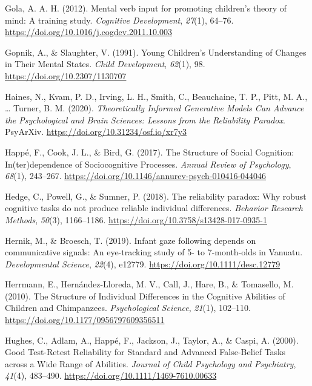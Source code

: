 \documentclass[
  man,floatsintext]{apa6}
\newlength{\cslhangindent}
\newlength{\cslentryspacingunit} %
\newenvironment{CSLReferences}[2] %
 {%
  \setlength{\parindent}{0pt}
  \ifodd #1
  \let\oldpar\par
  \def\par{\hangindent=\cslhangindent\oldpar}
  \fi
  \setlength{\parskip}{#2\cslentryspacingunit}
 }%
 {}
\begin{document}
\begin{CSLReferences}{1}{0}
\leavevmode{}%
Gola, A. A. H. (2012). Mental verb input for promoting children's theory of mind: {A} training study. \emph{Cognitive Development}, \emph{27}(1), 64--76. \url{https://doi.org/10.1016/j.cogdev.2011.10.003}

\leavevmode{}%
Gopnik, A., \& Slaughter, V. (1991). Young {Children}'s {Understanding} of {Changes} in {Their Mental States}. \emph{Child Development}, \emph{62}(1), 98. \url{https://doi.org/10.2307/1130707}

\leavevmode{}%
Haines, N., Kvam, P. D., Irving, L. H., Smith, C., Beauchaine, T. P., Pitt, M. A., \ldots{} Turner, B. M. (2020). \emph{Theoretically {Informed Generative Models Can Advance} the {Psychological} and {Brain Sciences}: {Lessons} from the {Reliability Paradox}}. {PsyArXiv}. \url{https://doi.org/10.31234/osf.io/xr7y3}

\leavevmode{}%
Happé, F., Cook, J. L., \& Bird, G. (2017). The {Structure} of {Social Cognition}: {In}(ter)dependence of {Sociocognitive Processes}. \emph{Annual Review of Psychology}, \emph{68}(1), 243--267. \url{https://doi.org/10.1146/annurev-psych-010416-044046}

\leavevmode{}%
Hedge, C., Powell, G., \& Sumner, P. (2018). The reliability paradox: {Why} robust cognitive tasks do not produce reliable individual differences. \emph{Behavior Research Methods}, \emph{50}(3), 1166--1186. \url{https://doi.org/10.3758/s13428-017-0935-1}

\leavevmode{}%
Hernik, M., \& Broesch, T. (2019). Infant gaze following depends on communicative signals: {An} eye-tracking study of 5- to 7-month-olds in {Vanuatu}. \emph{Developmental Science}, \emph{22}(4), e12779. \url{https://doi.org/10.1111/desc.12779}

\leavevmode{}%
Herrmann, E., Hernández-Lloreda, M. V., Call, J., Hare, B., \& Tomasello, M. (2010). The {Structure} of {Individual Differences} in the {Cognitive Abilities} of {Children} and {Chimpanzees}. \emph{Psychological Science}, \emph{21}(1), 102--110. \url{https://doi.org/10.1177/0956797609356511}

\leavevmode{}%
Hughes, C., Adlam, A., Happé, F., Jackson, J., Taylor, A., \& Caspi, A. (2000). Good {Test}-{Retest Reliability} for {Standard} and {Advanced False}-{Belief Tasks} across a {Wide Range} of {Abilities}. \emph{Journal of Child Psychology and Psychiatry}, \emph{41}(4), 483--490. \url{https://doi.org/10.1111/1469-7610.00633}


\end{CSLReferences}
\end{document}
